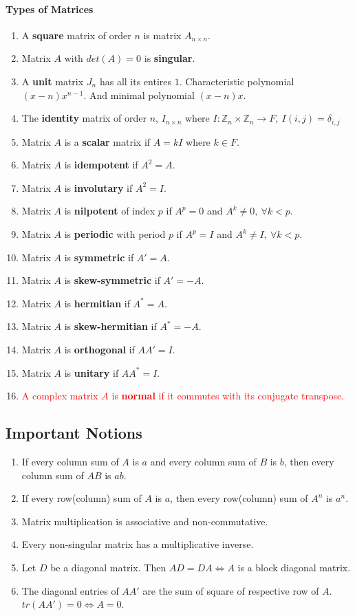 \paragraph{Types of Matrices}
\begin{enumerate}
	\item A \textbf{square} matrix of order $n$ is matrix $A_{n \times n}$.
	\item Matrix $A$ with $det(A) = 0$ is \textbf{singular}.
	\item A \textbf{unit} matrix $J_n$ has all its entires $1$.
		\subitem Characteristic polynomial $(x-n)x^{n-1}$. And minimal polynomial $(x-n)x$.
	\item The \textbf{identity} matrix of order $n$, $I_{n \times n}$ where $I : \mathbb{Z}_n \times \mathbb{Z}_n \to F,\ I(i,j) = \delta_{i,j}$
	\item Matrix $A$ is a \textbf{scalar} matrix if $A = kI$ where $k \in F$.
	\item Matrix $A$ is \textbf{idempotent} if $A^2 = A$.
	\item Matrix $A$ is \textbf{involutary} if $A^2 = I$.
	\item Matrix $A$ is \textbf{nilpotent} of index $p$ if $A^p = 0$ and $A^k \ne 0,\ \forall k < p$.
	\item Matrix $A$ is \textbf{periodic} with period $p$ if $A^p = I$ and $A^k \ne I,\ \forall k < p$.
	\item Matrix $A$ is \textbf{symmetric} if $A'=A$.
	\item Matrix $A$ is \textbf{skew-symmetric} if $A'=-A$.
	\item Matrix $A$ is \textbf{hermitian} if $A^\ast = A$.
	\item Matrix $A$ is \textbf{skew-hermitian} if $A^\ast = -A$.
	\item Matrix $A$ is \textbf{orthogonal} if $AA' = I$.
	\item Matrix $A$ is \textbf{unitary} if $AA^\ast = I$.
	\item \textcolor{red}{A complex matrix $A$ is \textbf{normal} if it commutes with its conjugate transpose.}
\end{enumerate}

\subsection*{Important Notions}
\begin{enumerate}
	\item If every column sum of $A$ is $a$ and every column sum of $B$ is $b$, then every column sum of $AB$ is $ab$.
	\item If every row(column) sum of $A$ is $a$, then every row(column) sum of $A^n$ is $a^n$.
	\item Matrix multiplication is associative and non-commutative.
	\item Every non-singular matrix has a multiplicative inverse.
	\item Let $D$ be a diagonal matrix.
	Then $AD = DA \iff A$ is a block diagonal matrix.
	\item The diagonal entries of $AA'$ are the sum of square of respective row of $A$.
		\subitem $tr(AA') = 0 \iff A = 0$.
\end{enumerate}

